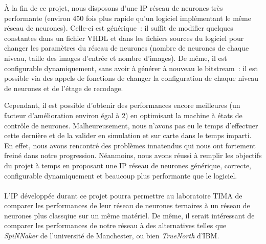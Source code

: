 \` {A} la fin de ce projet, nous disposons d'une IP réseau de neurones très performante (environ 450 fois plus rapide
qu'un logiciel implémentant le même réseau de neurones). Celle-ci est générique~: il suffit de modifier quelques constantes
dans un fichier VHDL et dans les fichiers sources du logiciel pour changer les paramètres du réseau de neurones (nombre de neurones
de chaque niveau, taille des images d'entrée et nombre d'images). De même, il est configurable dynamiquement, sans avoir à
générer à nouveau le bitstream~:
il est possible via des appels de fonctions de changer la configuration de chaque niveau de neurones et de l'étage de recodage.

Cependant, il est possible d'obtenir des performances encore meilleures (un facteur d'amélioration environ égal à 2) en optimisant la machine à
états de contrôle de neurones. Malheureusement, nous n'avons pas eu le temps d'effectuer cette dernière et de la valider en simulation et sur carte
dans le temps imparti. En effet, nous avons rencontré des problèmes innatendus qui nous ont fortement freiné dans notre progression.
Néanmoins, nous avons réussi à remplir les objectifs du projet à temps en proposant une IP réseau de neurones générique, correcte,
configurable dynamiquement et beaucoup plus performante que le logiciel.\\
~\\
L'IP développée durant ce projet pourra permettre au laboratoire TIMA de comparer les performances
de leur réseau de neurones ternaires à un réseau de neurones plus classqiue sur un même matériel.
De même, il serait intéressant de comparer les performances de notre réseau à des alternatives
telles que {\em SpiNNaker}\cite{painkras2013spinnaker} de l'université de Manchester, ou bien {\em TrueNorth}\cite{modha2014introducing} d'IBM.
